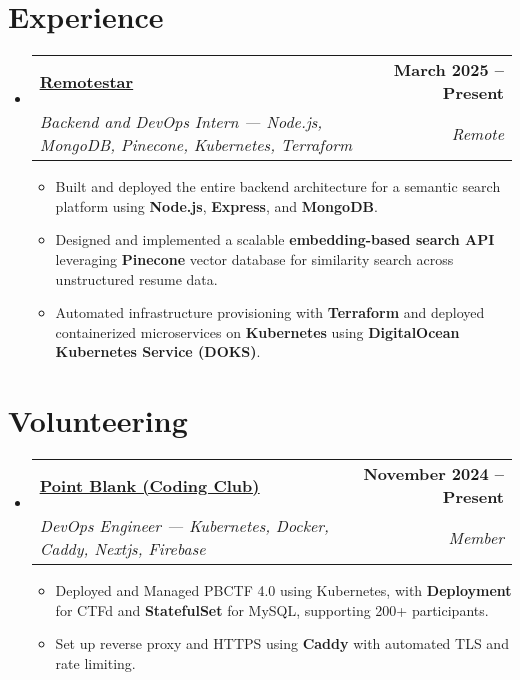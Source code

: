 \documentclass[a4paper,11pt]{article}
\makeatletter
\newcommand{\resumeSubheading}[4]{
  \vspace{-2pt}\item
    \begin{tabular*}{1.0\textwidth}[t]{l@{\extracolsep{\fill}}r}
      \textbf{#1} & \textbf{\small #2} \\
      \textit{\small#3} & \textit{\small #4} \\
    \end{tabular*}\vspace{-7pt}
}
\newcommand{\resumeSubHeadingListStart}{\begin{itemize}[leftmargin=0.0in, label={}]}
\newcommand{\resumeSubHeadingListEnd}{\end{itemize}}
\newcommand{\resumeItemListStart}{\begin{itemize}}
\newcommand{\resumeItemListEnd}{\end{itemize}\vspace{-5pt}}
\makeatother
\begin{document}
\section{Experience}
\resumeSubHeadingListStart
\resumeSubheading
{\href{https://www.remotestar.io/}{\underline{Remotestar}}}{March 2025 – Present}
{Backend and DevOps Intern — Node.js, MongoDB, Pinecone, Kubernetes, Terraform}{Remote}
\resumeItemListStart
  \item Built and deployed the entire backend architecture for a semantic search platform using \textbf{Node.js}, \textbf{Express}, and \textbf{MongoDB}.
  \item Designed and implemented a scalable \textbf{embedding-based search API} leveraging \textbf{Pinecone} vector database for similarity search across unstructured resume data.
  \item Automated infrastructure provisioning with \textbf{Terraform} and deployed containerized microservices on \textbf{Kubernetes} using \textbf{DigitalOcean Kubernetes Service (DOKS)}.
\resumeItemListEnd


\vspace{-4pt}

\resumeSubHeadingListEnd

\vspace{-10pt}

\section{Volunteering}
\resumeSubHeadingListStart
\resumeSubheading
{\href{https://www.pointblank.club/}{\underline{Point Blank (Coding Club)}}}{November 2024 -- Present}
{DevOps Engineer — Kubernetes, Docker, Caddy, Nextjs, Firebase}{Member}
\resumeItemListStart
  \item Deployed and Managed PBCTF 4.0 using Kubernetes, with {\textbf{Deployment}} for CTFd and {\textbf{StatefulSet}} for MySQL, supporting 200+ participants.
  \item Set up reverse proxy and HTTPS using \textbf{Caddy} with automated TLS and rate limiting.
\resumeItemListEnd
\vspace{-4pt}
\resumeSubHeadingListEnd


\vspace{-10pt}
\end{document}
